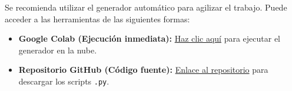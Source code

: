 \documentclass[11pt,a4paper]{article}
\begin{document}
\vspace{3mm}
Se recomienda utilizar el generador automático para agilizar el trabajo. Puede acceder a las herramientas de las siguientes formas:

\begin{itemize}
    \item \textbf{Google Colab (Ejecución inmediata):} \href{https://colab.research.google.com/drive/1DqE3bAAjAlz3yKFjbnRlixUpJeXvZfDs?usp=sharing}{\color{blue}Haz clic aquí\color{black}} para ejecutar el generador en la nube.
    \item \textbf{Repositorio GitHub (Código fuente):} \href{https://github.com/CondeLucento/MCTables}{\color{blue}Enlace al repositorio\color{black}} para descargar los scripts \texttt{.py}.
\end{itemize}
\end{document}
